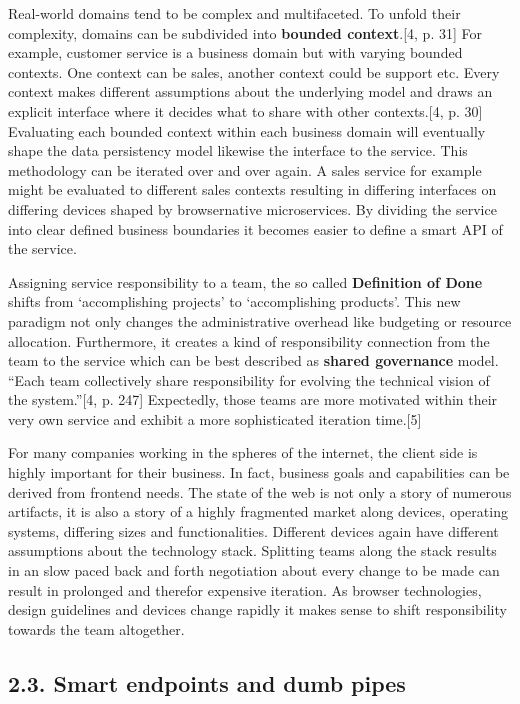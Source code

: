 \documentclass[]{article}
\begin{document}
Real-world domains tend to be complex and multifaceted. To unfold their
complexity, domains can be subdivided into \textbf{bounded
context}.{[}4, p. 31{]} For example, customer service is a business
domain but with varying bounded contexts. One context can be sales,
another context could be support etc. Every context makes different
assumptions about the underlying model and draws an explicit interface
where it decides what to share with other contexts.{[}4, p. 30{]}
Evaluating each bounded context within each business domain will
eventually shape the data persistency model likewise the interface to
the service. This methodology can be iterated over and over again. A
sales service for example might be evaluated to different sales contexts
resulting in differing interfaces on differing devices shaped by
browsernative microservices. By dividing the service into clear defined
business boundaries it becomes easier to define a smart API of the
service.

Assigning service responsibility to a team, the so called
\textbf{Definition of Done} shifts from `accomplishing projects' to
`accomplishing products'. This new paradigm not only changes the
administrative overhead like budgeting or resource allocation.
Furthermore, it creates a kind of responsibility connection from the
team to the service which can be best described as \textbf{shared
governance} model. ``Each team collectively share responsibility for
evolving the technical vision of the system.''{[}4, p. 247{]}
Expectedly, those teams are more motivated within their very own service
and exhibit a more sophisticated iteration time.{[}5{]}

For many companies working in the spheres of the internet, the client
side is highly important for their business. In fact, business goals and
capabilities can be derived from frontend needs. The state of the web is
not only a story of numerous artifacts, it is also a story of a highly
fragmented market along devices, operating systems, differing sizes and
functionalities. Different devices again have different assumptions
about the technology stack. Splitting teams along the stack results in
an slow paced back and forth negotiation about every change to be made
can result in prolonged and therefor expensive iteration. As browser
technologies, design guidelines and devices change rapidly it makes
sense to shift responsibility towards the team altogether.

\subsection{2.3. Smart endpoints and dumb
pipes}\label{smart-endpoints-and-dumb-pipes}
\end{document}
